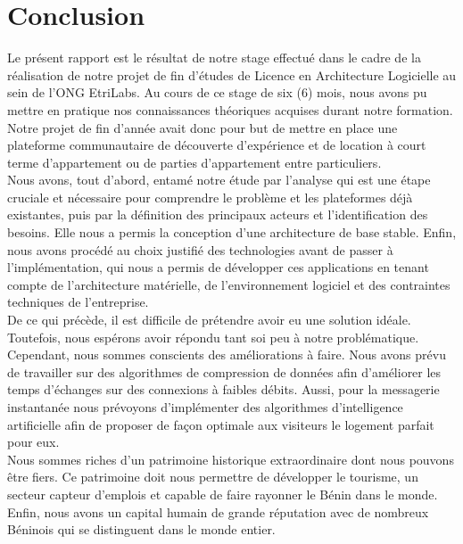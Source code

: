 \cleardoublepage
{}
{}
\chapter*{Conclusion}
Le présent rapport est le résultat de notre stage effectué dans le cadre de la réalisation de notre projet de fin d’études de Licence en Architecture Logicielle au sein de l’ONG EtriLabs. Au cours de ce stage de six (6) mois, nous avons pu mettre en pratique nos connaissances théoriques acquises durant notre formation.
\\Notre projet de fin d’année avait donc pour but de mettre en place une plateforme communautaire de découverte d’expérience et de location à court terme d’appartement ou de parties d’appartement entre particuliers.
\\Nous avons, tout d’abord, entamé notre étude par l’analyse qui est une étape cruciale et nécessaire pour comprendre le problème et les plateformes déjà existantes, puis par la définition des principaux acteurs et l’identification des besoins. Elle nous a permis la conception d’une architecture de base stable. Enfin, nous avons procédé au choix justifié des technologies avant de passer à l’implémentation, qui nous a permis de développer ces applications en tenant compte de l’architecture matérielle, de l’environnement logiciel et des contraintes techniques de l’entreprise.
\\De ce qui précède, il est difficile de prétendre avoir eu une solution idéale. Toutefois, nous espérons avoir répondu tant soi peu à notre problématique. Cependant, nous sommes conscients des améliorations à faire. Nous avons prévu de travailler sur des algorithmes de compression de données afin d’améliorer les temps d’échanges sur des connexions à faibles débits. Aussi, pour la messagerie instantanée nous prévoyons d'implémenter des algorithmes d'intelligence artificielle afin de proposer de façon optimale aux visiteurs le logement parfait pour eux.
\\Nous sommes riches d’un patrimoine historique extraordinaire dont nous pouvons être fiers. Ce patrimoine doit nous permettre de développer le tourisme, un secteur capteur d’emplois et capable de faire rayonner le Bénin dans le monde. Enfin, nous avons un capital humain de grande réputation avec de nombreux Béninois qui se distinguent dans le monde entier.